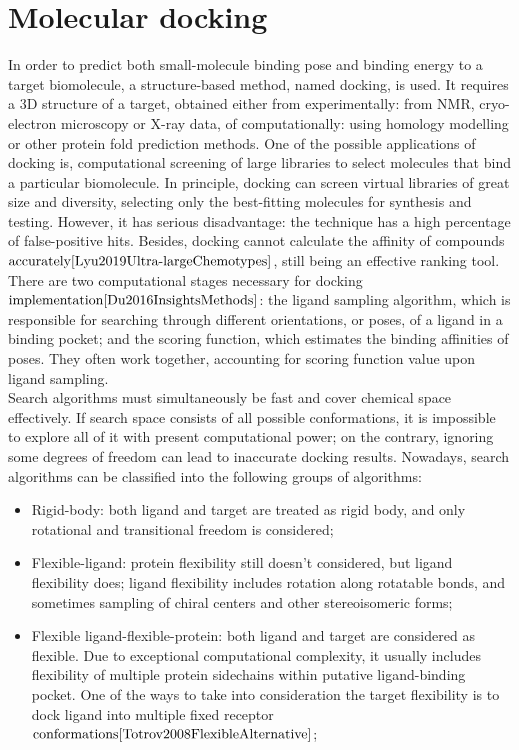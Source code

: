 \section{Molecular docking}
In order to predict both small-molecule binding pose and binding energy to a target biomolecule, a 
  structure-based method, named docking, is used. It requires a 3D structure of a target,
obtained either from experimentally: from NMR, cryo-electron microscopy or X-ray data, of computationally: using homology modelling or other protein fold prediction methods.
One of the possible applications of docking is, computational screening of large libraries to select molecules that bind a particular biomolecule.
  In principle, docking can screen virtual libraries of great size and diversity, 
selecting only the best-fitting molecules for synthesis and testing. 
  However, it has serious disadvantage: the technique has a high percentage of false-positive 
hits. 
  Besides, docking cannot calculate the affinity of compounds $\text{accurately}{\cite{Lyu2019Ultra-largeChemotypes}}$, 
still being an effective ranking tool.\\
  
  There are two computational stages necessary for docking $\text{implementation}{\cite{Du2016InsightsMethods}}$: 
the ligand sampling algorithm, which is responsible for searching through different orientations, 
or poses, of a ligand in a binding pocket; and the scoring function, which estimates 
the binding affinities of poses. They often work together, accounting for scoring function value upon ligand sampling. \\
  
  Search algorithms must simultaneously be fast and cover chemical space effectively.
  If search space consists of all possible conformations, it is impossible to explore 
all of it with present computational power; on the contrary, ignoring some degrees 
of freedom can lead to inaccurate docking results.
  Nowadays, search algorithms can be classified into the following groups of algorithms:
  \begin{itemize}
      \item 
      Rigid-body: both ligand and target are treated as rigid body, and only rotational 
and transitional freedom is considered;
      \item Flexible-ligand: protein flexibility still doesn't considered, but ligand flexibility does; ligand flexibility includes rotation along rotatable bonds, and sometimes sampling of chiral centers and other stereoisomeric forms;
      \item Flexible ligand-flexible-protein: both ligand and target are considered as flexible. Due to exceptional computational complexity, it usually includes flexibility of multiple protein sidechains within putative ligand-binding pocket. One of the ways to take into consideration the target flexibility is to dock ligand into multiple fixed receptor $\text{conformations}{\cite{Totrov2008FlexibleAlternative}}$;
  \end{itemize}
  
